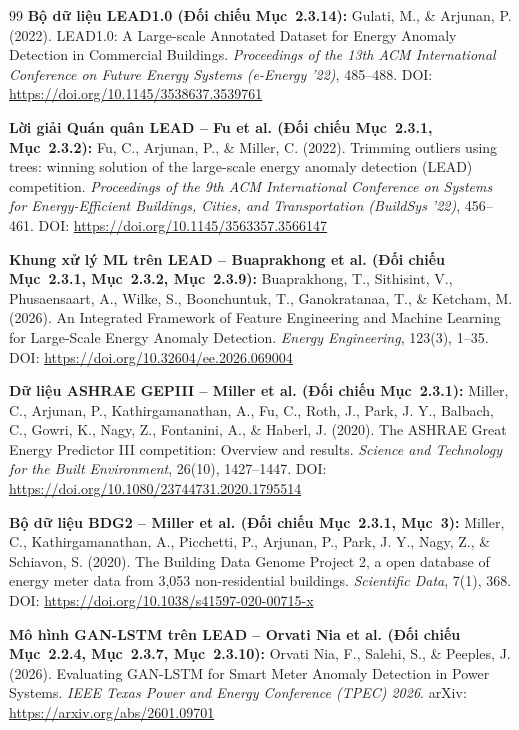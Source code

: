 \begin{thebibliography}{99}
     \textbf{Bộ dữ liệu LEAD1.0 (Đối chiếu Mục~2.3.14):} Gulati, M., \& Arjunan, P. (2022). LEAD1.0: A Large-scale Annotated Dataset for Energy Anomaly Detection in Commercial Buildings. \textit{Proceedings of the 13th ACM International Conference on Future Energy Systems (e-Energy '22)}, 485--488. DOI: \url{https://doi.org/10.1145/3538637.3539761}
    
     \textbf{Lời giải Quán quân LEAD -- Fu et al. (Đối chiếu Mục~2.3.1, Mục~2.3.2):} Fu, C., Arjunan, P., \& Miller, C. (2022). Trimming outliers using trees: winning solution of the large-scale energy anomaly detection (LEAD) competition. \textit{Proceedings of the 9th ACM International Conference on Systems for Energy-Efficient Buildings, Cities, and Transportation (BuildSys '22)}, 456--461. DOI: \url{https://doi.org/10.1145/3563357.3566147}
    
     \textbf{Khung xử lý ML trên LEAD -- Buaprakhong et al. (Đối chiếu Mục~2.3.1, Mục~2.3.2, Mục~2.3.9):} Buaprakhong, T., Sithisint, V., Phusaensaart, A., Wilke, S., Boonchuntuk, T., Ganokratanaa, T., \& Ketcham, M. (2026). An Integrated Framework of Feature Engineering and Machine Learning for Large-Scale Energy Anomaly Detection. \textit{Energy Engineering}, 123(3), 1--35. DOI: \url{https://doi.org/10.32604/ee.2026.069004}
    
     \textbf{Dữ liệu ASHRAE GEPIII -- Miller et al. (Đối chiếu Mục~2.3.1):} Miller, C., Arjunan, P., Kathirgamanathan, A., Fu, C., Roth, J., Park, J. Y., Balbach, C., Gowri, K., Nagy, Z., Fontanini, A., \& Haberl, J. (2020). The ASHRAE Great Energy Predictor III competition: Overview and results. \textit{Science and Technology for the Built Environment}, 26(10), 1427--1447. DOI: \url{https://doi.org/10.1080/23744731.2020.1795514}
    
     \textbf{Bộ dữ liệu BDG2 -- Miller et al. (Đối chiếu Mục~2.3.1, Mục~3):} Miller, C., Kathirgamanathan, A., Picchetti, P., Arjunan, P., Park, J. Y., Nagy, Z., \& Schiavon, S. (2020). The Building Data Genome Project 2, a open database of energy meter data from 3,053 non-residential buildings. \textit{Scientific Data}, 7(1), 368. DOI: \url{https://doi.org/10.1038/s41597-020-00715-x}
    
     \textbf{Mô hình GAN-LSTM trên LEAD -- Orvati Nia et al. (Đối chiếu Mục~2.2.4, Mục~2.3.7, Mục~2.3.10):} Orvati Nia, F., Salehi, S., \& Peeples, J. (2026). Evaluating GAN-LSTM for Smart Meter Anomaly Detection in Power Systems. \textit{IEEE Texas Power and Energy Conference (TPEC) 2026}. arXiv: \url{https://arxiv.org/abs/2601.09701}
    

\end{thebibliography}
